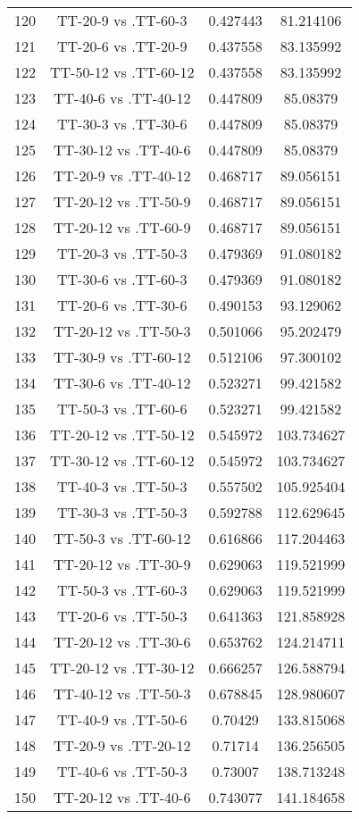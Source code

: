 \documentclass[a4paper,10pt]{article}
\begin{document}
\begin{landscape}
\begin{table}[!htp]
\begin{tabular}{cccc}
120&TT-20-9 vs .TT-60-3&0.427443&81.214106\\
121&TT-20-6 vs .TT-20-9&0.437558&83.135992\\
122&TT-50-12 vs .TT-60-12&0.437558&83.135992\\
123&TT-40-6 vs .TT-40-12&0.447809&85.08379\\
124&TT-30-3 vs .TT-30-6&0.447809&85.08379\\
125&TT-30-12 vs .TT-40-6&0.447809&85.08379\\
126&TT-20-9 vs .TT-40-12&0.468717&89.056151\\
127&TT-20-12 vs .TT-50-9&0.468717&89.056151\\
128&TT-20-12 vs .TT-60-9&0.468717&89.056151\\
129&TT-20-3 vs .TT-50-3&0.479369&91.080182\\
130&TT-30-6 vs .TT-60-3&0.479369&91.080182\\
131&TT-20-6 vs .TT-30-6&0.490153&93.129062\\
132&TT-20-12 vs .TT-50-3&0.501066&95.202479\\
133&TT-30-9 vs .TT-60-12&0.512106&97.300102\\
134&TT-30-6 vs .TT-40-12&0.523271&99.421582\\
135&TT-50-3 vs .TT-60-6&0.523271&99.421582\\
136&TT-20-12 vs .TT-50-12&0.545972&103.734627\\
137&TT-30-12 vs .TT-60-12&0.545972&103.734627\\
138&TT-40-3 vs .TT-50-3&0.557502&105.925404\\
139&TT-30-3 vs .TT-50-3&0.592788&112.629645\\
140&TT-50-3 vs .TT-60-12&0.616866&117.204463\\
141&TT-20-12 vs .TT-30-9&0.629063&119.521999\\
142&TT-50-3 vs .TT-60-3&0.629063&119.521999\\
143&TT-20-6 vs .TT-50-3&0.641363&121.858928\\
144&TT-20-12 vs .TT-30-6&0.653762&124.214711\\
145&TT-20-12 vs .TT-30-12&0.666257&126.588794\\
146&TT-40-12 vs .TT-50-3&0.678845&128.980607\\
147&TT-40-9 vs .TT-50-6&0.70429&133.815068\\
148&TT-20-9 vs .TT-20-12&0.71714&136.256505\\
149&TT-40-6 vs .TT-50-3&0.73007&138.713248\\
150&TT-20-12 vs .TT-40-6&0.743077&141.184658\\

\end{tabular}
\end{table}
\end{landscape}
\end{document}
